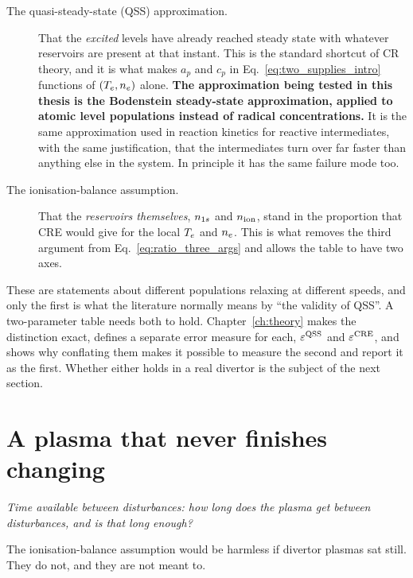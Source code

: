 \begin{description}
\item[The quasi-steady-state (QSS) approximation.] That the \emph{excited} levels
  have already reached steady state with whatever reservoirs are present at that
  instant. This is the standard shortcut of CR theory, and it is what makes
  $a_p$ and $c_p$ in Eq.~\eqref{eq:two_supplies_intro} functions of $(T_e,n_e)$
  alone. \textbf{The approximation being tested in this thesis is the Bodenstein
  steady-state approximation, applied to atomic level populations instead of
  radical concentrations.} It is the same approximation used in reaction kinetics
  for reactive intermediates, with the same justification, that the
  intermediates turn over far faster than anything else in the system. In
  principle it has the same failure mode too.

\item[The ionisation-balance assumption.] That the \emph{reservoirs themselves},
  $n_{1s}$ and $n_{\mathrm{ion}}$, stand in the proportion that CRE would give for the local
  $T_e$ and $n_e$. This is what removes the third argument from
  Eq.~\eqref{eq:ratio_three_args} and allows the table to have two axes.
\end{description}

These are statements about different populations relaxing at different speeds,
and only the first is what the literature normally means by ``the validity of
QSS''. A two-parameter table needs both to hold. Chapter~\ref{ch:theory} makes
the distinction exact, defines a separate error measure for each, $\varepsilon^{\mathrm{QSS}}$ and
$\varepsilon^{\mathrm{CRE}}$, and shows why conflating them makes it possible to measure the second
and report it as the first. Whether either holds in a real divertor is the
subject of the next section.

\section{A plasma that never finishes changing}
\label{sec:transients}

\emph{Time available between disturbances: how long does the plasma get between disturbances, and is
that long enough?}

The ionisation-balance assumption would be harmless if divertor plasmas sat
still. They do not, and they are not meant to.

